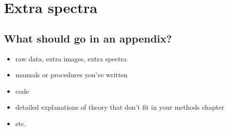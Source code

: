\chapter{Extra spectra}\label{app:spect}

\section{What should go in an appendix?}

\begin{itemize}
\item raw data, extra images, extra spectra
\item manuals or procedures you've written
\item code
\item detailed explanations of theory that don't fit in your methods chapter
\item etc.
\end{itemize}